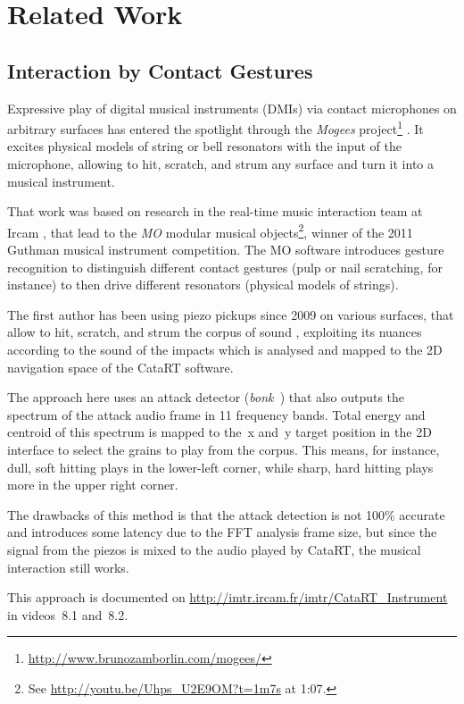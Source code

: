 \section{Related Work}

\subsection{Interaction by Contact Gestures}

Expressive play of digital musical instruments (DMIs) via contact microphones on arbitrary surfaces has entered the spotlight through the \textit{Mogees} project\footnote{\url{http://www.brunozamborlin.com/mogees/}}  \cite{Zamborlin14a}.  It excites physical models of string or bell resonators with the input of the microphone, allowing to hit, scratch, and strum any surface and turn it into a musical instrument.  

That work was based on research in the real-time music interaction team at Ircam \cite{Rasamimanana11a,Bevilacqua11b}, that lead to the \textit{MO} modular musical objects\footnote{See \url{http://youtu.be/Uhps_U2E9OM?t=1m7s} at 1:07.}, winner of the 2011 Guthman musical instrument competition.
The MO software introduces gesture recognition to distinguish different contact gestures (pulp or nail scratching, for instance) to then drive different resonators (physical models of strings).

The first author has been using piezo pickups since 2009 on various surfaces, that allow to hit, scratch, and strum the corpus of sound \cite{Schwarz-nime2012-sound-space}, exploiting
its nuances according to the sound of the impacts which is analysed and mapped to
the 2D navigation space of the CataRT software.

The approach here uses an attack detector (\textit{bonk~}) that also outputs the spectrum of the
attack audio frame in 11 frequency bands.  Total energy and centroid of this spectrum is mapped to
the~x and~y target position in the 2D interface to select the grains to play from the corpus.
This means, for instance, dull, soft hitting plays in the lower-left corner, while sharp, hard hitting plays more in the upper right corner.

The drawbacks of this method is that the attack detection is not 100\% accurate and introduces some latency due to the FFT analysis frame size, but since the signal from the piezos is mixed to the
audio played by CataRT, the musical interaction still works.

This approach is documented on \url{http://imtr.ircam.fr/imtr/CataRT_Instrument} in videos~8.1 and~8.2.


